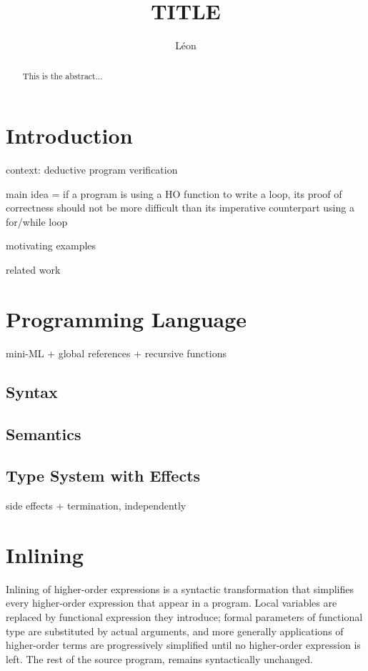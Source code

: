 \documentclass[a4paper,11pt,oneside]{article}
\title{TITLE}
\author{Léon}
\theoremstyle{plain}
\begin{document}
\maketitle

\tableofcontents

\begin{abstract}
  This is the abstract...
\end{abstract}

\section{Introduction}

context: deductive program verification~\cite{filliatre11sttt}

main idea = if a program is using a HO function to write a loop, its
proof of correctness should not be more difficult than its imperative
counterpart using a for/while loop

motivating examples

related work 

\section{Programming Language}

mini-ML + global references + recursive functions

\subsection{Syntax}

\subsection{Semantics}

\subsection{Type System with Effects}

side effects + termination, independently
\newpage
\section{Inlining}

Inlining of higher-order expressions is a syntactic transformation that simplifies every higher-order expression that appear in a program. Local variables are replaced by functional expression they introduce; formal parameters of functional type are substituted by actual arguments, and more generally applications of higher-order terms are progressively simplified until no higher-order expression is left. The rest of the source program,  remains syntactically unchanged. 
\end{document}
